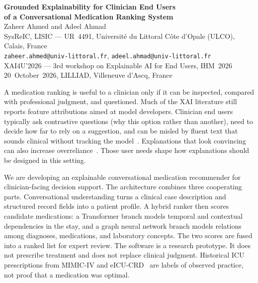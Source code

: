\documentclass[11pt,a4paper]{article}
\begin{document}
\begin{center}
{\Large\bfseries Grounded Explainability for Clinician End Users\\[0.15em]
of a Conversational Medication Ranking System}\\[0.7em]
{\large Zaheer Ahmed and Adeel Ahmad}\\[0.25em]
{\small SysReIC, LISIC --- UR~4491, Universit\'e du Littoral C\^ote d'Opale (ULCO), Calais, France}\\[0.12em]
{\small\texttt{zaheer.ahmed@univ-littoral.fr},\quad
\texttt{adeel.ahmad@univ-littoral.fr}}\\[0.45em]
{\footnotesize XAI4U'2026 --- 3rd workshop on Explainable AI for End Users, IHM~2026}\\
{\footnotesize 20~October~2026, LILLIAD, Villeneuve d'Ascq, France}
\end{center}

\vspace{0.15em}

A medication ranking is useful to a clinician only if it can be inspected, compared with professional judgment, and questioned. Much of the XAI literature still reports feature attributions aimed at model developers. Clinician end users typically ask contrastive questions (why this option rather than another), need to decide how far to rely on a suggestion, and can be misled by fluent text that sounds clinical without tracking the model~\cite{miller2019,jacovi2020}. Explanations that look convincing can also increase overreliance~\cite{bucinca2021}. Those user needs shape how explanations should be designed in this setting.

We are developing an explainable conversational medication recommender for clinician-facing decision support. The architecture combines three cooperating parts. Conversational understanding turns a clinical case description and structured record fields into a patient profile. A hybrid ranker then scores candidate medications: a Transformer branch models temporal and contextual dependencies in the stay, and a graph neural network branch models relations among diagnoses, medications, and laboratory concepts. The two scores are fused into a ranked list for expert review. The software is a research prototype. It does not prescribe treatment and does not replace clinical judgment. Historical ICU prescriptions from MIMIC-IV and eICU-CRD~\cite{johnson2023,pollard2018} are labels of observed practice, not proof that a medication was optimal.
\end{document}
